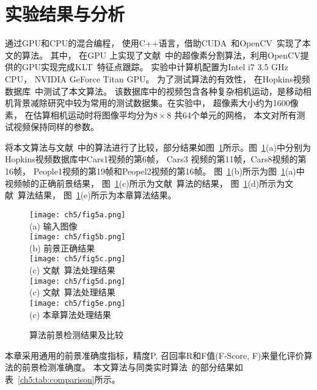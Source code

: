 \section{实验结果与分析}
\label{ch5:sec:results}
 通过GPU和CPU的混合编程， 使用C++语言，借助CUDA~\cite{CUDA}和OpenCV~\cite{opencv_library}实现了本文的算法。 其中， 在GPU 上实现了文献~\cite{superpixel}中的超像素分割算法，利用OpenCV提供的GPU实现完成KLT~\cite{KLT}特征点跟踪。 实验中计算机配置为Intel i7 3.5 GHz CPU， NVIDIA GeForce Titan GPU。 为了测试算法的有效性， 在Hopkins视频数据库~\cite{HopKinsDataSet}中测试了本文算法。 该数据库中的视频包含各种复杂相机运动，是移动相机背景减除研究中较为常用的测试数据集。在实验中， 超像素大小约为1600像素， 在估算相机运动时将图像平均分为$8 \times 8$ 共64个单元的网格， 本文对所有测试视频保持同样的参数。\par
将本文算法与文献~中的算法进行了比较，部分结果如图~\ref{ch5:fig:comparison}所示。图~\ref{ch5:fig:comparison}(a)中分别为Hopkins视频数据库中Cars1视频的第6帧， Cars3 视频的第11帧，Cars8视频的第16帧， People1视频的第19帧和Peopel2视频的第16帧。 图~\ref{ch5:fig:comparison}(b)所示为图~\ref{ch5:fig:comparison}(a)中视频帧的正确前景结果， 图~\ref{ch5:fig:comparison}(c)所示为文献~算法的结果， 图~\ref{ch5:fig:comparison}(d)所示为文献~算法结果，  图~\ref{ch5:fig:comparison}(e)所示为本章算法结果。
\begin{figure}[ht]
  \centering
  \texttt{[image: ch5/fig5a.png]}\\
  (a) 输入图像\\
   \texttt{[image: ch5/fig5b.png]}\\
   (b) 前景正确结果\\
   \texttt{[image: ch5/fig5c.png]}\\
   (c) 文献~算法处理结果\\
   \texttt{[image: ch5/fig5d.png]}\\
   (c) 文献~算法处理结果\\
   \texttt{[image: ch5/fig5e.png]}\\
   (c) 本章算法处理结果\\
  \caption{算法前景检测结果及比较}\label{ch5:fig:comparison}
\end{figure}


 本章采用通用的前景准确度指标，精度P, 召回率R和F值(F-Score, F)来量化评价算法的前景检测准确度。 本文算法与同类实时算法~\cite{5.8s}的部分结果如表~\ref{ch5:tab:comparison}所示。

